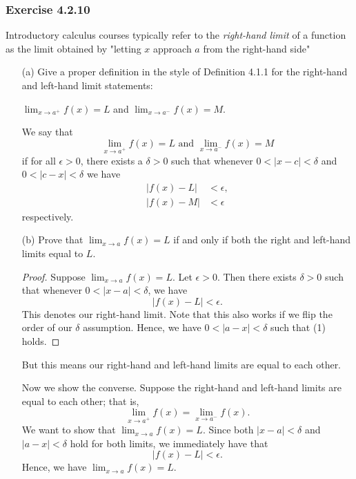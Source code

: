 \subsubsection{Exercise 4.2.10}

Introductory calculus courses typically refer to the \textit{right-hand limit} of a function as the limit obtained by "letting \( x \) approach \( a \) from the right-hand side"

\begin{enumerate}
    \item[(a)] Give a proper definition in the style of Definition 4.1.1 for the right-hand and left-hand limit statements: 

        \begin{center}
            \( \lim_{ x \to a^{+} } f(x) = L  \) and \( \lim_{ x \to a^{-} } f(x) = M. \) 
        \end{center}
        \begin{definition}
        We say that
        \[ \lim_{ x \to a^{+}  } f(x) = L  \text{~and~} \lim_{ x \to a^{-} } f(x) = M  \]  
        if for all \( \epsilon > 0  \), there exists a \(  \delta > 0 \) such that whenever \( 0 < | x - c  | < \delta \)  and \( 0 < | c - x  | < \delta  \) we have 
        \begin{align*}
            | f(x) - L  | &< \epsilon, \\
            | f(x) - M  | &< \epsilon
        \end{align*}
        respectively.
        \end{definition}
    \item[(b)] Prove that \( \lim_{ x \to a } f(x) = L  \) if and only if both the right and left-hand limits equal to \( L  \).
        \begin{proof}
        Suppose \( \lim_{ x \to a } f(x) = L  \). Let \( \epsilon > 0  \). Then there exists \( \delta > 0  \) such that whenever \( 0 < | x - a  | < \delta  \), we have 
        \[ | f(x) - L  | < \epsilon. \tag{1} \]
        This denotes our right-hand limit. Note that this also works if we flip the order of our \( \delta \) assumption. Hence, we have \( 0 < | a - x  | < \delta \) such that (1) holds. 
        \end{proof}
        But this means our right-hand and left-hand limits are equal to each other.

        Now we show the converse. Suppose the right-hand and left-hand limits are equal to each other; that is, 
        \[ \lim_{ x \to a^{+}  } f(x) = \lim_{ x \to a^{-}  } f(x).\]
        We want to show that \( \lim_{ x \to a } f(x) = L  \). Since both \( | x - a  | < \delta \) and \( | a - x   | < \delta  \) hold for both limits, we immediately have that 
        \[  | f(x) - L  | < \epsilon. \]
        Hence, we have \( \lim_{ x \to a } f(x) = L  \).
\end{enumerate}





